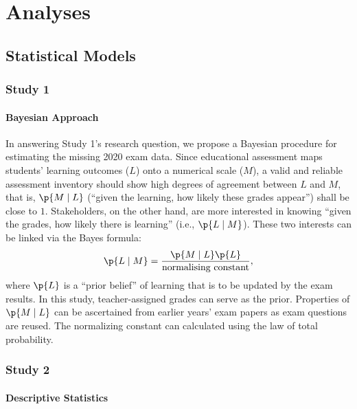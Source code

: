 \section{Analyses}

\subsection{Statistical Models}

\subsubsection{Study 1}

\paragraph{Bayesian Approach}

In answering Study 1's research question, we propose a Bayesian procedure for estimating the missing 2020 exam data. Since educational assessment maps students' learning outcomes ($L$) onto a numerical scale ($M$), a valid and reliable assessment inventory should show high degrees of agreement between $L$ and $M$, that is, $\p{M \mid L}$ (“given the learning, how likely these grades appear”) shall be close to $1$. Stakeholders, on the other hand, are more interested in knowing “given the grades, how likely there is learning” (i.e., $\p{L \mid M}$). These two interests can be linked via the Bayes formula:
\begin{equation}
    \p{L \mid M} = \frac{\p{M \mid L} \p{L}}{\text{normalising constant}},
\end{equation}
where $\p{L}$ is a ``prior belief'' of learning that is to be updated by the exam results. In this study, teacher-assigned grades can serve as the prior. Properties of $\p{M \mid L}$ can be ascertained from earlier years' exam papers as exam questions are reused. The normalizing constant can calculated using the law of total probability.

\subsubsection{Study 2}

\paragraph{Descriptive Statistics}

